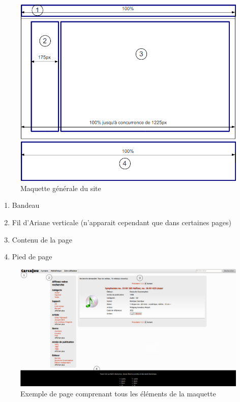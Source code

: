 \documentclass[letter, 11pt, draft]{report}
\begin{document}
\begin{figure}[htbp]
	\begin{center}
		\includegraphics[scale=0.6]{maquetteImage.png}
	\end{center}
	\caption{Maquette générale du site}
\end{figure}

\begin{enumerate}
	\item Bandeau
	\item Fil d'Ariane verticale (n'apparait cependant que dans certaines pages)
	\item Contenu de la page
	\item Pied de page
\end{enumerate}

\begin{figure}[htbp]
	\begin{center}
		\includegraphics[scale=0.3]{pageType.png}
	\end{center}
	\caption{Exemple de page comprenant tous les éléments de la maquette}
\end{figure}
\end{document}
